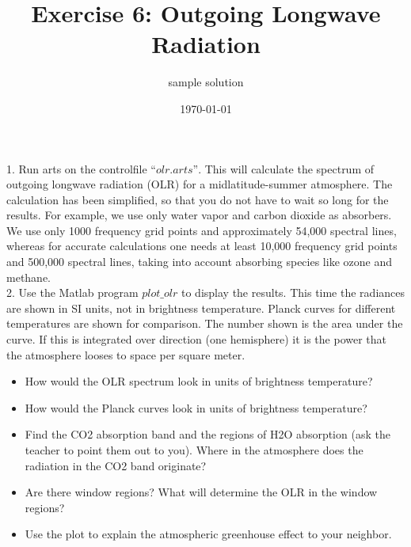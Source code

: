 \documentclass[paper=a4, fontsize=11pt]{scrartcl} %
\title{Exercise 6: Outgoing Longwave Radiation}
\author{sample solution}
\date{\normalsize\today}
\begin{document}
\maketitle

1. Run arts on the controlfile $“olr.arts”$. This will calculate the spectrum of outgoing 
longwave radiation (OLR) for a midlatitude-summer atmosphere. The calculation has been simplified, 
so that you do not have to wait so long for the results. For example, we use only water vapor and 
carbon dioxide as absorbers. We use only 1000 frequency grid points and approximately 54,000 spectral 
lines, whereas for accurate calculations one needs at least 10,000 frequency grid points and 500,000 
spectral lines, taking into account absorbing species like ozone and methane.\ \\

2. Use the Matlab program $plot\_olr$ to display the results. This time the radiances 
are shown in SI units, not in brightness temperature.  Planck curves for different temperatures are 
shown for comparison. The number shown is the area under the curve. If this is integrated over 
direction (one hemisphere) it is the power that the atmosphere looses to space per square meter. \ \\

\begin{itemize}
	\item How would the OLR spectrum look in units of brightness temperature?
	\item How would the Planck curves look in units of brightness temperature?
	\item Find the CO2 absorption band and the regions of H2O absorption (ask the teacher 
	    to point them out to you). Where in the atmosphere does the radiation in the CO2 band originate? 
	\item Are there window regions? What will determine the OLR in the window regions?
	\item Use the plot to explain the atmospheric greenhouse effect to your neighbor. \ \\
\end{itemize}
\end{document}
